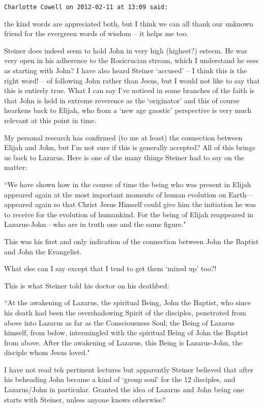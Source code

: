 \begin{footnotesize}
\begin{sffamily}
\hfill

\texttt{Charlotte Cowell on 2012-02-11 at 13:09 said: }

the kind words are appreciated both, but I think we can all thank our unknown friend for the evergreen words of wisdom – it helps me too. 

Steiner does indeed seem to hold John in very high (highest?) esteem. He was very open in his adherence to the Rosicrucian stream, which I understand he sees as starting with John? I have also heard Steiner `accused’ – I think this is the right word! – of following John rather than Jesus, but I would not like to say that this is entirely true. What I can say I've noticed in some branches of the faith is that John is held in extreme reverence as the `originator' and this of course hearkens back to Elijah, who from a `new age gnostic' perspective is very much relevant at this point in time. 

My personal research has confirmed (to me at least) the connection between Elijah and John, but I'm not sure if this is generally accepted? All of this brings us back to Lazarus. Here is one of the many things Steiner had to say on the matter: 

``We have shown how in the course of time the being who was present in Elijah appeared again at the most important moments of human evolution on Earth—appeared again so that Christ Jesus Himself could give him the initiation he was to receive for the evolution of humankind. For the being of Elijah reappeared in Lazarus-John—who are in truth one and the same figure." 

This was his first and only indication of the connection between John the Baptist and John the Evangelist.

What else can I say except that I tend to get them `mixed up' too?!

This is what Steiner told his doctor on his deathbed:

``At the awakening of Lazarus, the spiritual Being, John the Baptist, who since his death had been the overshadowing Spirit of the disciples, penetrated from above into Lazarus as far as the Consciousness Soul; the Being of Lazarus himself, from below, intermingled with the spiritual Being of John the Baptist from above. After the awakening of Lazarus, this Being is Lazarus-John, the disciple whom Jesus loved."

I have not read teh pertinent lectures but apparently Steiner believed that after his beheading John became a kind of `group soul' for the 12 disciples, and Lazarus/John in particular. Granted the idea of Lazarus and John being one starts with Steiner, unless anyone knows otherwise?


\end{sffamily}
\end{footnotesize}
